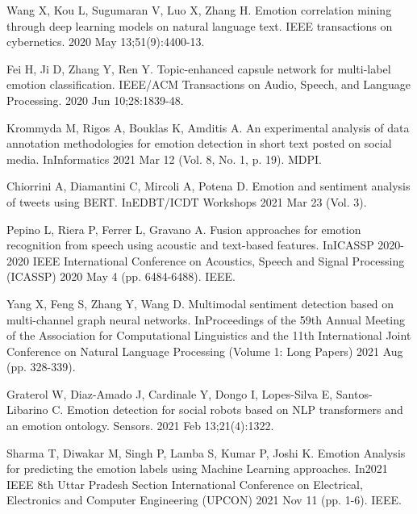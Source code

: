 \documentclass[12pt,notitlepage,oneside]{report}
\begin{document}







%

%

%


%


	
\renewcommand{\bibname}{References}
\begin{thebibliography}{8}
Wang X, Kou L, Sugumaran V, Luo X, Zhang H. Emotion correlation mining through deep learning models on natural language text. IEEE transactions on cybernetics. 2020 May 13;51(9):4400-13.

Fei H, Ji D, Zhang Y, Ren Y. Topic-enhanced capsule network for multi-label emotion classification. IEEE/ACM Transactions on Audio, Speech, and Language Processing. 2020 Jun 10;28:1839-48.

Krommyda M, Rigos A, Bouklas K, Amditis A. An experimental analysis of data annotation methodologies for emotion detection in short text posted on social media. InInformatics 2021 Mar 12 (Vol. 8, No. 1, p. 19). MDPI.

Chiorrini A, Diamantini C, Mircoli A, Potena D. Emotion and sentiment analysis of tweets using BERT. InEDBT/ICDT Workshops 2021 Mar 23 (Vol. 3).

Pepino L, Riera P, Ferrer L, Gravano A. Fusion approaches for emotion recognition from speech using acoustic and text-based features. InICASSP 2020-2020 IEEE International Conference on Acoustics, Speech and Signal Processing (ICASSP) 2020 May 4 (pp. 6484-6488). IEEE.

Yang X, Feng S, Zhang Y, Wang D. Multimodal sentiment detection based on multi-channel graph neural networks. InProceedings of the 59th Annual Meeting of the Association for Computational Linguistics and the 11th International Joint Conference on Natural Language Processing (Volume 1: Long Papers) 2021 Aug (pp. 328-339).

Graterol W, Diaz-Amado J, Cardinale Y, Dongo I, Lopes-Silva E, Santos-Libarino C. Emotion detection for social robots based on NLP transformers and an emotion ontology. Sensors. 2021 Feb 13;21(4):1322.

Sharma T, Diwakar M, Singh P, Lamba S, Kumar P, Joshi K. Emotion Analysis for predicting the emotion labels using Machine Learning approaches. In2021 IEEE 8th Uttar Pradesh Section International Conference on Electrical, Electronics and Computer Engineering (UPCON) 2021 Nov 11 (pp. 1-6). IEEE.

\end{thebibliography}

\printindex

\appendix
%
\end{document}
